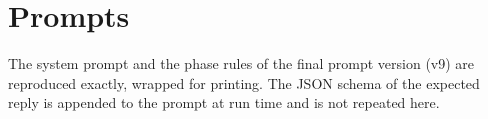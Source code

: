 \chapter{Prompts}
\label{app:prompts}
The system prompt and the phase rules of the final prompt version (v9) are reproduced exactly, wrapped for
printing. The JSON schema of the expected reply is appended to the prompt at run time and is not repeated here.



